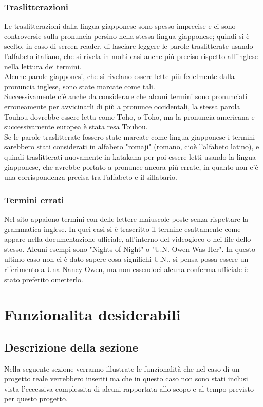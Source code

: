 \documentclass[openany, a4paper, 12pt]{report}
\begin{document}
			\subsection{Traslitterazioni}
				Le traslitterazioni dalla lingua giapponese sono spesso imprecise e ci sono controversie sulla pronuncia persino nella stessa lingua giapponese; quindi si è scelto, in caso di screen reader, di lasciare leggere le parole traslitterate usando l'alfabeto italiano, che si rivela in molti casi anche più preciso rispetto all'inglese nella lettura dei termini.\\
				Alcune parole giapponesi, che si rivelano essere lette più fedelmente dalla pronuncia inglese, sono state marcate come tali.\\
				Successivamente c'è anche da considerare che alcuni termini sono pronunciati erroneamente per avvicinarli di più a pronunce occidentali, la stessa parola Touhou dovrebbe essere letta come Tōhō, o Tohō, ma la pronuncia americana e successivamente europea è stata resa Touhou.\\
				Se le parole traslitterate fossero state marcate come lingua giapponese i termini sarebbero stati considerati in alfabeto "romaji" (romano, cioè l'alfabeto latino), e quindi traslitterati nuovamente in katakana per poi essere letti usando la lingua giapponese, che avrebbe portato a pronunce ancora più errate, in quanto non c'è una corrispondenza precisa tra l'alfabeto e il sillabario.
				
			\subsection{Termini errati}
				Nel sito appaiono termini con delle lettere maiuscole poste senza rispettare la grammatica inglese. In quei casi si è trascritto il termine esattamente come appare nella documentazione ufficiale, all'interno del videogioco o nei file dello stesso. Alcuni esempi sono "Nights of Night" o "U.N. Owen Was Her". In questo ultimo caso non ci è dato sapere cosa significhi U.N., si pensa possa essere un riferimento a Una Nancy Owen, ma non essendoci alcuna conferma ufficiale è stato preferito ometterlo.\\

	\chapter{Funzionalita desiderabili}
		\section{Descrizione della sezione}
		Nella seguente sezione verranno illustrate le funzionalità che nel caso di un progetto reale verrebbero inseriti ma che in questo caso non sono stati inclusi vista l'eccessiva complessita di alcuni rapportata allo scopo e al tempo previsto per questo progetto.
\end{document}
